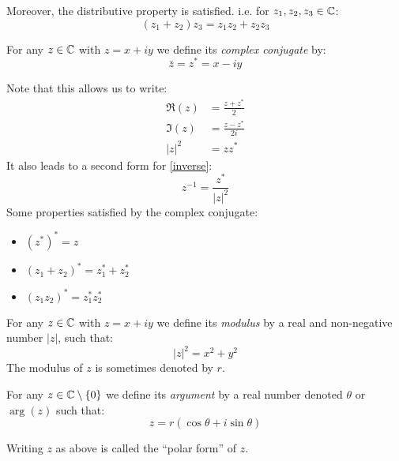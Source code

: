 \documentclass[../main.tex]{subfiles}
\begin{document}
Moreover, the distributive property is satisfied. i.e. for $z_1, z_2, z_3 \in \mathbb{C}$:
\[
  (z_1 + z_2)z_3 = z_1 z_2 + z_2 z_3
\]
\begin{definition}
  For any $z \in \mathbb{C}$ with $z = x + iy$ we define its \textit{complex conjugate} by:
  \[
    \bar{z} = z^{*} = x - iy
  \]
\end{definition}
Note that this allows us to write:
\begin{align*}
  \Re(z) &= \frac{z + z^{*}}{2} \\
  \Im(z) &= \frac{z - z^{*}}{2i} \\
  |z|^2 &= z z^{*}
\end{align*}
It also leads to a second form for \cref{inverse}:
\[
  z^{-1} = \frac{z^{*}}{|z|^2}
\]
Some properties satisfied by the complex conjugate:
\begin{itemize}
  \item $(z^{*})^{*} = z$
  \item $(z_1 + z_2)^{*} = z^{*}_{1} + z^{*}_{2}$
  \item $(z_1 z_2)^{*} = z^{*}_{1} z^{*}_{2}$
\end{itemize}
\begin{definition}
  For any $z \in \mathbb{C}$ with $z = x + iy$ we define its \textit{modulus} by a real and non-negative number $|z|$, such that:
  \[
    |z|^2 = x^2 + y^2
  \]
  The modulus of $z$ is sometimes denoted by $r$.
\end{definition}
\begin{definition}
  For any $z \in \mathbb{C} \setminus \{0\}$ we define its \textit{argument} by a real number denoted $\theta$ or $\arg(z)$ such that:
  \[
    z = r(\cos \theta + i \sin \theta)
  \]
\end{definition}
Writing $z$ as above is called the ``polar form'' of $z$.
\end{document}
